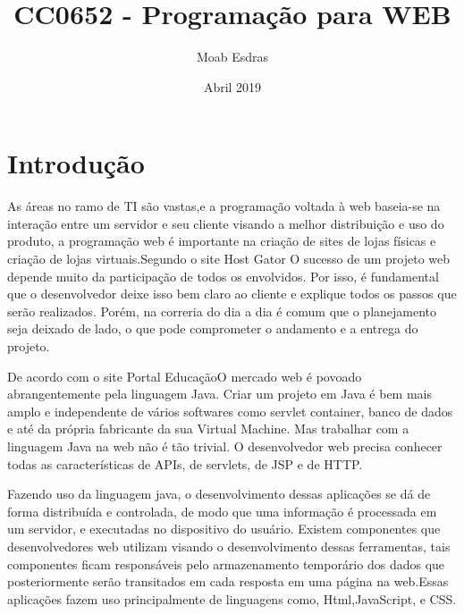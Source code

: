 \documentclass[10pt]{article}
\title{CC0652 - Programação para WEB}
\author{Moab Esdras}
\date{Abril 2019}
\begin{document}
\maketitle

\section{Introdução}
\quad As áreas no ramo de TI são vastas,e a programação voltada à web baseia-se na interação entre um servidor e seu cliente visando a melhor distribuição e uso do produto, a programação web é importante na criação de sites de lojas físicas e criação de lojas virtuais.Segundo o site Host Gator\cite{ref2} O sucesso de um projeto web depende muito da participação de todos os envolvidos. Por isso, é fundamental que o desenvolvedor deixe isso bem claro ao cliente e explique todos os passos que serão realizados. Porém, na correria do dia a dia é comum que o planejamento seja deixado de lado, o que pode comprometer o andamento e a entrega do projeto. 

\quad De acordo com o site Portal Educação\cite{ref1}O mercado web é povoado abrangentemente pela linguagem Java. Criar um projeto em Java é bem mais amplo e independente de vários softwares como servlet container, banco de dados e até da própria fabricante da sua Virtual Machine. Mas trabalhar com a linguagem Java na web não é tão trivial. O desenvolvedor web precisa conhecer todas as características de APIs, de servlets, de JSP e de HTTP.

\quad Fazendo uso da linguagem java, o desenvolvimento dessas aplicações se dá de forma distribuída e controlada, de modo que uma informação é processada em um servidor, e executadas no dispositivo do usuário. Existem componentes que desenvolvedores web utilizam visando o desenvolvimento dessas ferramentas, tais componentes ficam responsáveis pelo armazenamento temporário dos dados que posteriormente serão transitados em cada resposta em uma página na web.Essas aplicações fazem uso principalmente de linguagens como, Html,JavaScript, e CSS.
\end{document}
